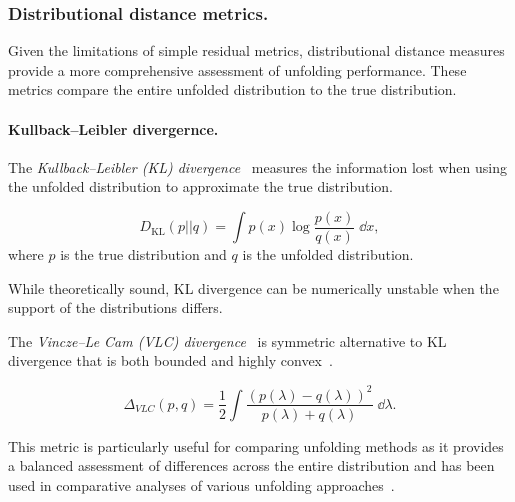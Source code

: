         \subsubsection{Distributional distance metrics.}
        \label{subsubsec:distributional-distance-metrics}
            Given the limitations of simple residual metrics, distributional distance measures provide a more comprehensive assessment of unfolding performance.
            These metrics compare the entire unfolded distribution to the true distribution.
            
            \paragraph{Kullback--Leibler divergernce.}
            The \emph{Kullback--Leibler (KL) divergence}~\cite{kullback_information_1951} measures the information lost when using the unfolded distribution to approximate the true distribution.
            
            \begin{definition}[KL divergence]
                \begin{equation}
                    D_{\text{KL}}(p||q) = \int p(x) \log \frac{p(x)}{q(x)} \;\dd x,
                \end{equation}
                where \(p\) is the true distribution and
                \(q\) is the unfolded distribution.
            \end{definition}
            
            While theoretically sound, KL divergence can be numerically unstable when the support of the distributions differs.
            
            The \emph{Vincze--Le Cam (VLC) divergence}~\cite{vincze_concept_1981,Cam1986AsymptoticTheory} is symmetric alternative to KL divergence that is both bounded and highly convex~\cite{melbourne_strongly_2020}.

            \begin{definition}
                \begin{equation}
                    \Delta_{VLC}(p, q) = \frac{1}{2}\int \frac{(p(\lambda) - q(\lambda))^2}{p(\lambda) + q(\lambda)} \;\dd\lambda.
                \end{equation}
            \end{definition}

            This metric is particularly useful for comparing unfolding methods as it provides a balanced assessment of differences across the entire distribution and has been used in comparative analyses of various unfolding approaches~\cite{andreassen_omnifold_2020, komiske_preserving_2021}.

